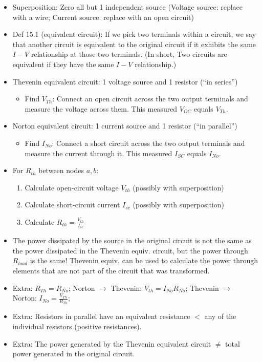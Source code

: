 \documentclass{article}
\begin{document}
\begin{itemize}
	\item Superposition: Zero all but 1 independent source (Voltage source: replace with a wire; Current source: replace with an open circuit)
	\item Def 15.1 (equivalent circuit): If we pick two terminals within a circuit, we say that another circuit is equivalent to the original circuit if it exhibits the same $I-V$ relationship at those two terminals. (In short, Two circuits are equivalent if they have the same $I-V$ relationship.)
	\item Thevenin equivalent circuit: 1 voltage source and 1 resistor (``in series'')
	\begin{itemize}
		\item Find $V_{Th}$: Connect an open circuit across the two output terminals and measure the voltage across them. This measured $V_{OC}$ equals $V_{Th}$.
	\end{itemize}
	\item Norton equivalent circuit: 1 current source and 1 resistor (``in parallel'')
	\begin{itemize}
		\item Find $I_{No}$: Connect a short circuit across the two output terminals and measure the current through it. This measured $I_{SC}$ equals $I_{No}$.
	\end{itemize}
	\item For $R_{th}$ between nodes $a,b$:
	\begin{enumerate}
		\item Calculate open-circuit voltage $V_{th}$ (possibly with superposition)
		\item Calculate short-circuit current $I_{sc}$ (possibly with superposition)
		\item Calculate $R_{th} = \frac{V_{th}}{I_{sc}}$
	\end{enumerate}
	\item The power dissipated by the source in the original circuit is not the same as the power dissipated in the Thevenin equiv. circuit, but the power through $R_{load}$ is the same! Thevenin equiv. can be used to calculate the power through elements that are not part of the circuit that was transformed.
	\item Extra: {\color{red} $R_{Th} = R_{No}$}; Norton $\rightarrow$ Thevenin: $V_{th} = I_{No}R_{No}$; Thevenin $\rightarrow$ Norton: $I_{No} = \frac{V_{Th}}{R_{Th}}$;
	\item Extra: Resistors in parallel have an equivalent resistance $<$ any of the individual resistors (positive resistances).
	\item Extra: The power generated by the Thevenin equivalent circuit $\neq$ total power generated in the original circuit.
\end{itemize}
\end{document}
